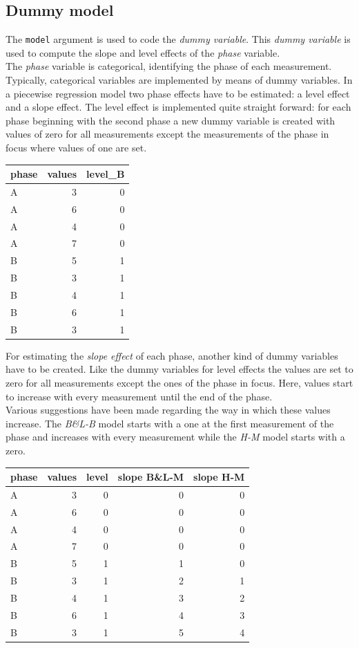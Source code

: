 \documentclass[
]{book}
\begin{document}
\hypertarget{dummy-model}{%
\subsection{Dummy model}\label{dummy-model}}

The \texttt{model} argument is used to code the \emph{dummy variable}. This \emph{dummy variable} is used to compute the slope and level effects of the \emph{phase} variable.\\
The \emph{phase} variable is categorical, identifying the phase of each measurement. Typically, categorical variables are implemented by means of dummy variables. In a piecewise regression model two phase effects have to be estimated: a level effect and a slope effect. The level effect is implemented quite straight forward: for each phase beginning with the second phase a new dummy variable is created with values of zero for all measurements except the measurements of the phase in focus where values of one are set.

\begin{tabular}{l|r|r}
\hline
phase & values & level\_B\\
\hline
A & 3 & 0\\
\hline
A & 6 & 0\\
\hline
A & 4 & 0\\
\hline
A & 7 & 0\\
\hline
B & 5 & 1\\
\hline
B & 3 & 1\\
\hline
B & 4 & 1\\
\hline
B & 6 & 1\\
\hline
B & 3 & 1\\
\hline
\end{tabular}

For estimating the \emph{slope effect} of each phase, another kind of dummy variables have to be created. Like the dummy variables for level effects the values are set to zero for all measurements except the ones of the phase in focus. Here, values start to increase with every measurement until the end of the phase.\\
Various suggestions have been made regarding the way in which these values increase. The \emph{B\&L-B} model starts with a one at the first measurement of the phase and increases with every measurement while the \emph{H-M} model starts with a zero.

\begin{tabular}{l|r|r|r|r}
\hline
phase & values & level & slope B\&L-M & slope H-M\\
\hline
A & 3 & 0 & 0 & 0\\
\hline
A & 6 & 0 & 0 & 0\\
\hline
A & 4 & 0 & 0 & 0\\
\hline
A & 7 & 0 & 0 & 0\\
\hline
B & 5 & 1 & 1 & 0\\
\hline
B & 3 & 1 & 2 & 1\\
\hline
B & 4 & 1 & 3 & 2\\
\hline
B & 6 & 1 & 4 & 3\\
\hline
B & 3 & 1 & 5 & 4\\
\hline
\end{tabular}
\end{document}
